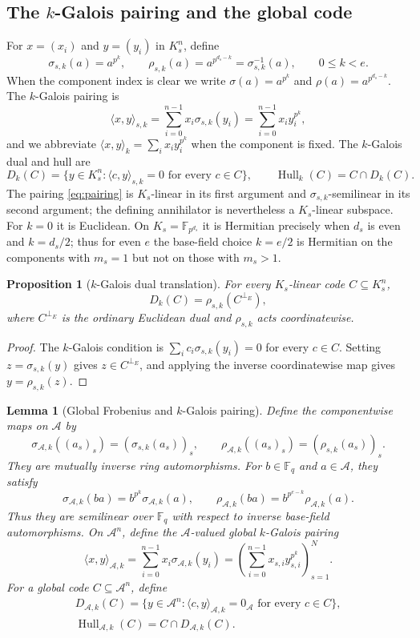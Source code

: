 \documentclass[10pt,a4paper]{article}
\newcommand{\F}{\mathbb F}
\newcommand{\A}{\mathcal A}
\newcommand{\Hull}{\operatorname{Hull}}
\newcommand{\perpE}{\perp_E}
\newcommand{\Dk}{D_k}
\numberwithin{equation}{section}
\theoremstyle{plain}
\newtheorem{lemma}[theorem]{Lemma}
\newtheorem{proposition}[theorem]{Proposition}
\theoremstyle{definition}
\theoremstyle{remark}
\begin{document}
\subsection{The \texorpdfstring{$k$}{k}-Galois pairing and the global code}\label{sec:pairing}

For $x=(x_i)$ and $y=(y_i)$ in $K_s^n$, define
\[
\sigma_{s,k}(a)=a^{p^k},
\qquad
\rho_{s,k}(a)=a^{p^{d_s-k}}=\sigma_{s,k}^{-1}(a),
\qquad 0\leq k<e .
\]
When the component index is clear we write $\sigma(a)=a^{p^k}$ and
$\rho(a)=a^{p^{d_s-k}}$. The $k$-Galois pairing is
\begin{equation}\label{eq:pairing}
\langle x,y\rangle_{s,k}
 =\sum_{i=0}^{n-1}x_i\sigma_{s,k}(y_i)
 =\sum_{i=0}^{n-1}x_i y_i^{p^k},
\end{equation}
and we abbreviate $\langle x,y\rangle_k=\sum_i x_i y_i^{p^k}$ when the component
is fixed. The $k$-Galois dual and hull are
\[
\Dk(C)=\{y\in K_s^n:\langle c,y\rangle_{s,k}=0\text{ for every }c\in C\},
\qquad
\Hull_k(C)=C\cap \Dk(C).
\]
The pairing \eqref{eq:pairing} is $K_s$-linear in its first argument and
$\sigma_{s,k}$-semilinear in its second argument; the defining annihilator is
nevertheless a $K_s$-linear subspace. For $k=0$ it is Euclidean. On
$K_s=\F_{p^{d_s}}$ it is Hermitian precisely when $d_s$ is even and $k=d_s/2$;
thus for even $e$ the base-field choice $k=e/2$ is Hermitian on the components
with $m_s=1$ but not on those with $m_s>1$.

\begin{proposition}[$k$-Galois dual translation]\label{prop:dual-translation}
For every $K_s$-linear code $C\subseteq K_s^n$,
\[
\Dk(C)=\rho_{s,k}(C^{\perpE}),
\]
where $C^{\perpE}$ is the ordinary Euclidean dual and $\rho_{s,k}$ acts
coordinatewise.
\end{proposition}

\begin{proof}
The $k$-Galois condition is $\sum_i c_i\sigma_{s,k}(y_i)=0$ for every $c\in C$.
Setting $z=\sigma_{s,k}(y)$ gives $z\in C^{\perpE}$, and applying the inverse
coordinatewise map gives $y=\rho_{s,k}(z)$.
\end{proof}

\begin{lemma}[Global Frobenius and $k$-Galois pairing]\label{lem:global-pairing}
Define the componentwise maps on $\A$ by
\[
\sigma_{\A,k}((a_s)_s)=(\sigma_{s,k}(a_s))_s,
\qquad
\rho_{\A,k}((a_s)_s)=(\rho_{s,k}(a_s))_s .
\]
They are mutually inverse ring automorphisms. For $b\in\F_q$ and $a\in\A$, they
satisfy
\[
\sigma_{\A,k}(ba)=b^{p^k}\sigma_{\A,k}(a),\qquad
\rho_{\A,k}(ba)=b^{p^{e-k}}\rho_{\A,k}(a).
\]
Thus they are semilinear over $\F_q$ with respect to inverse base-field
automorphisms. On $\A^n$, define the $\A$-valued global $k$-Galois pairing
\[
\langle x,y\rangle_{\A,k}
 =\sum_{i=0}^{n-1}x_i\sigma_{\A,k}(y_i)
 =\left(\sum_{i=0}^{n-1}x_{s,i}y_{s,i}^{p^k}\right)_{s=1}^{N}.
\]
For a global code $C\subseteq\A^n$, define
\[
\begin{gathered}
D_{\A,k}(C)=\{y\in\A^n:\langle c,y\rangle_{\A,k}=0_{\A}\text{ for every }c\in C\},
\\
\Hull_{\A,k}(C)=C\cap D_{\A,k}(C).
\end{gathered}
\]
\end{lemma}
\end{document}
